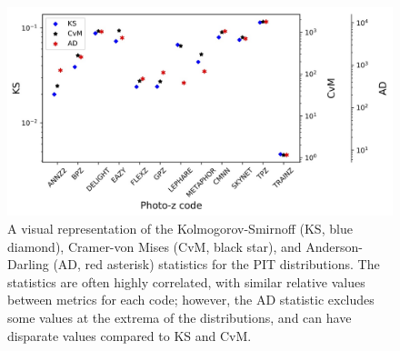 \begin{figure}
\centering
\includegraphics[width=\textwidth]{fig/KSvsCvMvsAD_PIT_withnull_jpg.jpg}
\caption{A visual representation of the Kolmogorov-Smirnoff (KS, blue diamond), Cramer-von Mises (CvM, black star), and Anderson-Darling (AD, red asterisk) statistics for the PIT distributions.  The statistics are often highly correlated, with similar relative values between metrics for each code; however, the AD statistic excludes some values at the extrema of the distributions, and can have disparate values compared to KS and CvM.} \label{fig:pit_stats}
\end{figure}


